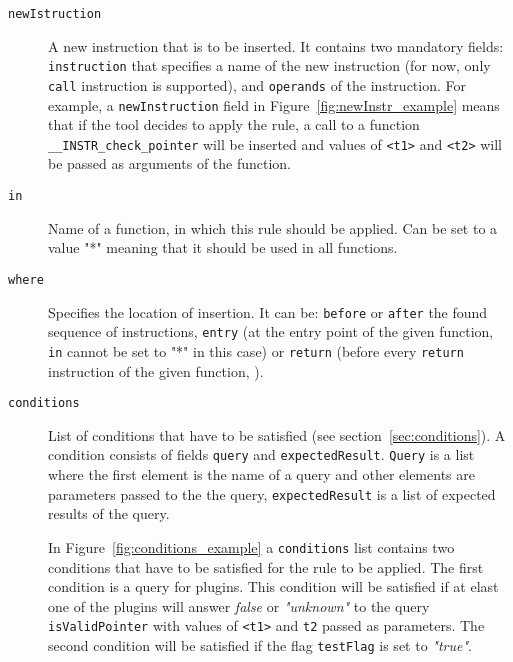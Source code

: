 \begin{description}
    \item[\texttt{newIstruction}] A new instruction that is to be inserted. It
    contains two mandatory fields: \texttt{instruction} that specifies a name
    of the new instruction (for now, only \texttt{call} instruction is
    supported), and \texttt{operands} of the instruction. For example, a
    \texttt{newInstruction} field in Figure~\ref{fig:newInstr_example} means
    that if the tool decides to apply the rule, a call to a function
    \texttt{\_\_INSTR\_check\_pointer} will be inserted and values of
    \texttt{<t1>} and \texttt{<t2>} will be passed as arguments of the
    function.

     \begin{minipage}{\linewidth}
        
        \label{fig:newInstr_example}
      \end{minipage}

    \item[\texttt{in}] Name of a function, in which this rule should be
    applied. Can be set to a value "*" meaning that it should be used in all
    functions.

    \item[\texttt{where}] Specifies the location of insertion. It can be:
    \texttt{before} or \texttt{after} the found sequence of instructions,
    \texttt{entry} (at the entry point of the given function, \texttt{in}
    cannot be set to "*" in this case) or \texttt{return} (before every
    \texttt{return} instruction of the given function, ).

    \item[\texttt{conditions}] List of conditions that have to be satisfied
    (see section~\ref{sec:conditions}). A condition consists of fields
    \texttt{query} and \texttt{expectedResult}. \texttt{Query} is a list
    where the first element is the name of a query and other elements are
    parameters passed to the the query, \texttt{expectedResult} is a list of
    expected results of the query.

    In Figure~\ref{fig:conditions_example} a \texttt{conditions} list contains
    two conditions that have to be satisfied for the rule to be applied. The
    first condition is a query for plugins. This condition will be satisfied if
    at elast one of the plugins will answer \emph{false} or \emph{"unknown"} to
    the query \texttt{isValidPointer} with values of \texttt{<t1>} and
    \texttt{t2} passed as parameters. The second condition will be satisfied if
    the flag \texttt{testFlag} is set to \emph{"true"}.


\end{description}
